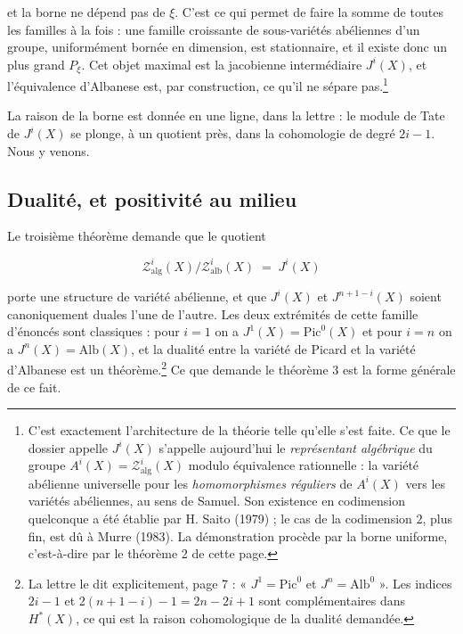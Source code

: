 \documentclass[11pt,a4paper]{article}
\begin{document}
et la borne ne dépend pas de $\xi$. C'est ce qui permet de faire la somme de
toutes les familles à la fois : une famille croissante de sous-variétés
abéliennes d'un groupe, uniformément bornée en dimension, est stationnaire, et
il existe donc un plus grand $P_{\xi}$. Cet objet maximal est la jacobienne
intermédiaire $J^{i}(X)$, et l'équivalence d'Albanese est, par construction, ce
qu'il ne sépare pas.\footnote{C'est exactement l'architecture de la théorie
telle qu'elle s'est faite. Ce que le dossier appelle $J^{i}(X)$ s'appelle
aujourd'hui le \emph{représentant algébrique} du groupe
$A^{i}(X) = \mathcal{Z}^{i}_{\mathrm{alg}}(X)$ modulo équivalence rationnelle :
la variété abélienne universelle pour les \emph{homomorphismes réguliers} de
$A^{i}(X)$ vers les variétés abéliennes, au sens de Samuel. Son existence en
codimension quelconque a été établie par H. Saito (1979) ; le cas de la
codimension $2$, plus fin, est dû à Murre (1983). La démonstration procède par
la borne uniforme, c'est-à-dire par le théorème 2 de cette page.}

La raison de la borne est donnée en une ligne, dans la lettre : le module de
Tate de $J^{i}(X)$ se plonge, à un quotient près, dans la cohomologie de degré
$2i-1$. Nous y venons.

\subsection*{Dualité, et positivité au milieu}

Le troisième théorème demande que le quotient

\[
  \mathcal{Z}^{i}_{\mathrm{alg}}(X)/\mathcal{Z}^{i}_{\mathrm{alb}}(X)
  \;=\; J^{i}(X)
\]

porte une structure de variété abélienne, et que $J^{i}(X)$ et $J^{n+1-i}(X)$
soient canoniquement duales l'une de l'autre. Les deux extrémités de cette
famille d'énoncés sont classiques : pour $i=1$ on a $J^{1}(X)=\mathrm{Pic}^{0}(X)$
et pour $i=n$ on a $J^{n}(X)=\mathrm{Alb}(X)$, et la dualité entre la variété de
Picard et la variété d'Albanese est un théorème.\footnote{La lettre le dit
explicitement, page 7 : « $J^{1} = \mathrm{Pic}^{0}$ et $J^{n} =
\mathrm{Alb}^{0}$ ». Les indices $2i-1$ et $2(n+1-i)-1 = 2n-2i+1$ sont
complémentaires dans $H^{*}(X)$, ce qui est la raison cohomologique de la
dualité demandée.} Ce que demande le théorème 3 est la forme générale de ce
fait.
\end{document}
